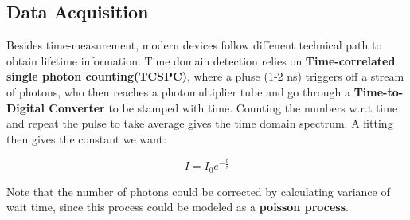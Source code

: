 \documentclass[12pt]{ctexart}
\begin{document}
\subsection*{Data Acquisition}
\par Besides time-measurement, modern devices follow diffenent technical path to obtain lifetime information. 
Time domain detection relies on \textbf{Time-correlated single photon counting(TCSPC)}, where a pluse (1-2 ns) triggers off a stream of photons, who then reaches a photomultiplier tube and go through a \textbf{Time-to-Digital Converter} to be stamped with time. Counting the numbers w.r.t time and repeat the pulse to take average gives the time domain spectrum. A fitting then gives the constant we want:
\begin{framed}
    \begin{equation}
        I=I_0e^{-\frac{t}{\tau}}
        \label{decay_equ}
    \end{equation}
\end{framed}
\begin{framed}
    \noindent Note that the number of photons could be corrected by calculating variance of wait time, since this process could be modeled as a \textbf{poisson process}.
\end{framed}
\end{document}
